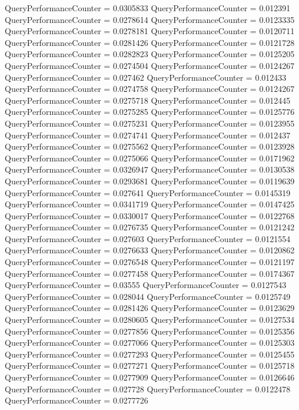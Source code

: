 \documentclass[9pt]{article}
\theoremstyle{plain}
\theoremstyle{definition}
\theoremstyle{remark}
\numberwithin{equation}{section}
\begin{document}
QueryPerformanceCounter  =  0.0305833
QueryPerformanceCounter  =  0.012391
QueryPerformanceCounter  =  0.0278614
QueryPerformanceCounter  =  0.0123335
QueryPerformanceCounter  =  0.0278181
QueryPerformanceCounter  =  0.0120711
QueryPerformanceCounter  =  0.0281426
QueryPerformanceCounter  =  0.0121728
QueryPerformanceCounter  =  0.0282823
QueryPerformanceCounter  =  0.0125205
QueryPerformanceCounter  =  0.0274504
QueryPerformanceCounter  =  0.0124267
QueryPerformanceCounter  =  0.027462
QueryPerformanceCounter  =  0.012433
QueryPerformanceCounter  =  0.0274758
QueryPerformanceCounter  =  0.0124267
QueryPerformanceCounter  =  0.0275718
QueryPerformanceCounter  =  0.012445
QueryPerformanceCounter  =  0.0275285
QueryPerformanceCounter  =  0.0125776
QueryPerformanceCounter  =  0.0275231
QueryPerformanceCounter  =  0.0123955
QueryPerformanceCounter  =  0.0274741
QueryPerformanceCounter  =  0.012437
QueryPerformanceCounter  =  0.0275562
QueryPerformanceCounter  =  0.0123928
QueryPerformanceCounter  =  0.0275066
QueryPerformanceCounter  =  0.0171962
QueryPerformanceCounter  =  0.0326947
QueryPerformanceCounter  =  0.0130538
QueryPerformanceCounter  =  0.0293681
QueryPerformanceCounter  =  0.0119639
QueryPerformanceCounter  =  0.027641
QueryPerformanceCounter  =  0.0145319
QueryPerformanceCounter  =  0.0341719
QueryPerformanceCounter  =  0.0147425
QueryPerformanceCounter  =  0.0330017
QueryPerformanceCounter  =  0.0122768
QueryPerformanceCounter  =  0.0276735
QueryPerformanceCounter  =  0.0121242
QueryPerformanceCounter  =  0.027603
QueryPerformanceCounter  =  0.0121554
QueryPerformanceCounter  =  0.0276633
QueryPerformanceCounter  =  0.0120862
QueryPerformanceCounter  =  0.0276548
QueryPerformanceCounter  =  0.0121197
QueryPerformanceCounter  =  0.0277458
QueryPerformanceCounter  =  0.0174367
QueryPerformanceCounter  =  0.03555
QueryPerformanceCounter  =  0.0127543
QueryPerformanceCounter  =  0.028044
QueryPerformanceCounter  =  0.0125749
QueryPerformanceCounter  =  0.0281426
QueryPerformanceCounter  =  0.0123629
QueryPerformanceCounter  =  0.0280605
QueryPerformanceCounter  =  0.0127534
QueryPerformanceCounter  =  0.0277856
QueryPerformanceCounter  =  0.0125356
QueryPerformanceCounter  =  0.0277066
QueryPerformanceCounter  =  0.0125303
QueryPerformanceCounter  =  0.0277293
QueryPerformanceCounter  =  0.0125455
QueryPerformanceCounter  =  0.0277271
QueryPerformanceCounter  =  0.0125718
QueryPerformanceCounter  =  0.0277909
QueryPerformanceCounter  =  0.0126646
QueryPerformanceCounter  =  0.027728
QueryPerformanceCounter  =  0.0122478
QueryPerformanceCounter  =  0.0277726
\end{document}
